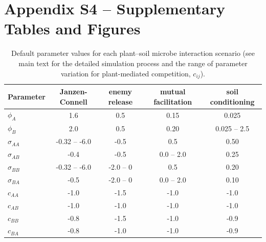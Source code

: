 \section{Appendix S4 -- Supplementary Tables and Figures}
\begin{table}[h]
	\centerfloat
	\caption[Default parameter values for each plant--soil microbe interaction scenario.]
	{Default parameter values for each plant--soil microbe interaction scenario (see main text for the detailed simulation process and the range of parameter variation for plant-mediated competition, $c_{ij}$).}
	\label{table:Parameters}
	\begin{tabular}{lcccc}
		\toprule \textbf{Parameter} & \textbf{Janzen-Connell} & \textbf{enemy release} & \textbf{mutual facilitation} & \textbf{soil conditioning} \tabularnewline
		\midrule
		\midrule
		$\phi_{A}$    &  1.6          &  0.5      &  0.15       &  0.025 \tabularnewline
		$\phi_{B}$    &  2.0          &  0.5      &  0.20       &  0.025 -- 2.5 \tabularnewline
		$\sigma_{AA}$ & -0.32 -- -6.0 & -0.5      &  0.5        &  0.50 \tabularnewline
		$\sigma_{AB}$ & -0.4          & -0.5      &  0.0 -- 2.0 &  0.25 \tabularnewline
		$\sigma_{BB}$ & -0.32 -- -6.0 & -2.0 -- 0 &  0.5        &  0.20 \tabularnewline
		$\sigma_{BA}$ & -0.5          & -2.0 -- 0 &  0.0 -- 2.0 &  0.10 \tabularnewline
		$c_{AA}$      & -1.0          & -1.5      & -1.0        & -1.0 \tabularnewline
		$c_{AB}$      & -1.0          & -1.0      & -1.0        & -1.0 \tabularnewline
		$c_{BB}$      & -0.8          & -1.5      & -1.0        & -0.9 \tabularnewline
		$c_{BA}$      & -0.8          & -1.0      & -1.0        & -0.9 \tabularnewline
		\bottomrule
	\end{tabular}%
\end{table}
\bigskip\bigskip\bigskip\bigskip
\bigskip\bigskip\bigskip\bigskip




